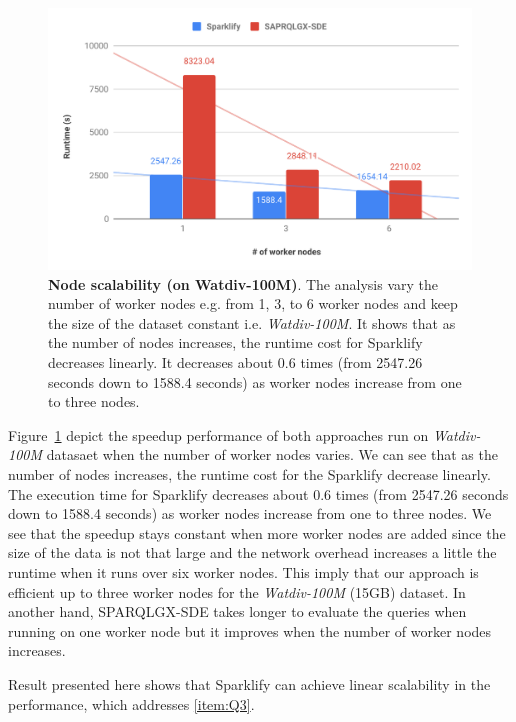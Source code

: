 \begin{figure}
  \includegraphics[width=1.0\columnwidth]{images/6_scalable_rdf_querying/sparklify-node-scalability.pdf}
    \caption{\textbf{Node scalability (on Watdiv-100M)}.
    The analysis vary the number of worker nodes e.g. from 1, 3, to 6 worker nodes and keep the size of the dataset constant i.e. \textit{Watdiv-100M}.
    It shows that as the number of nodes increases, the runtime cost for Sparklify decreases linearly.
    It decreases about 0.6 times (from 2547.26 seconds down to 1588.4 seconds) as worker nodes increase from one to three nodes.}
    \label{fig:sparklify-node-scalability}
\end{figure}

Figure~\ref{fig:sparklify-node-scalability} depict the speedup performance of both approaches run on \textit{Watdiv-100M} datasaet when the number of worker nodes varies.
We can see that as the number of nodes increases, the runtime cost for the Sparklify decrease linearly.
The execution time for Sparklify decreases about 0.6 times (from 2547.26 seconds down to 1588.4 seconds) as worker nodes increase from one to three nodes.
We see that the speedup stays constant when more worker nodes are added since the size of the data is not that large and the network overhead increases a little the runtime when it runs over six worker nodes.
This imply that our approach is efficient up to three worker nodes for the \textit{Watdiv-100M} (15GB) dataset.
In another hand, SPARQLGX-SDE takes longer to evaluate the queries when running on one worker node but it improves when the number of worker nodes increases.

Result presented here shows that Sparklify can achieve linear scalability in the performance, which addresses \ref{item:Q3}.

